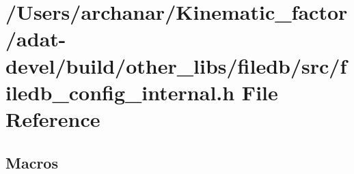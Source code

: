 \hypertarget{adat-devel_2build_2other__libs_2filedb_2src_2filedb__config__internal_8h}{}\section{/\+Users/archanar/\+Kinematic\+\_\+factor/adat-\/devel/build/other\+\_\+libs/filedb/src/filedb\+\_\+config\+\_\+internal.h File Reference}
\label{adat-devel_2build_2other__libs_2filedb_2src_2filedb__config__internal_8h}
\subsection*{Macros}
